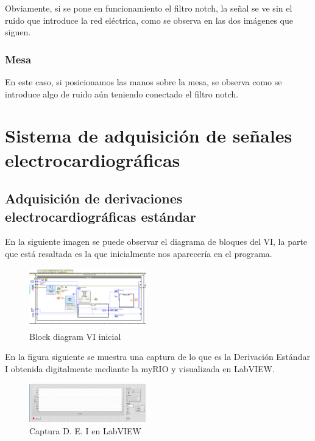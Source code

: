 \documentclass[conference]{IEEEtran}
\begin{document}
Obviamente, si se pone en funcionamiento el filtro notch, la señal se ve sin el ruido que introduce la red eléctrica, como se observa en las dos imágenes que siguen.


\subsubsection{Mesa}
En este caso, si posicionamos las manos sobre la mesa, se observa como se introduce algo de ruido aún teniendo conectado el filtro notch.
    
\section{Sistema de adquisición de señales electrocardiográficas}
\subsection{Adquisición de derivaciones electrocardiográficas estándar}
En la siguiente imagen se puede observar el diagrama de bloques del VI, la parte que está resaltada es la que inicialmente nos aparecería en el programa.
\begin{figure}[H]
    \centerline{\includegraphics[width=0.45\textwidth]{e_diagramVI.png}}
    \caption{Block diagram VI inicial}
    \end{figure}

En la figura siguiente se muestra una captura de lo que es la Derivación Estándar I obtenida digitalmente mediante la myRIO y visualizada en LabVIEW.
\begin{figure}[H]
    \centerline{\includegraphics[width=0.45\textwidth]{e_captura.png}}
    \caption{Captura D. E. I en LabVIEW}
    \end{figure}
\end{document}
